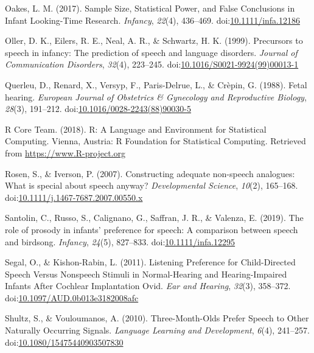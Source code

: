 \documentclass[man]{apa6}
\begin{document}
\hypertarget{ref-oakes_sample_2017}{}
Oakes, L. M. (2017). Sample Size, Statistical Power, and False
Conclusions in Infant Looking-Time Research. \emph{Infancy},
\emph{22}(4), 436--469.
doi:\href{https://doi.org/10.1111/infa.12186}{10.1111/infa.12186}

\hypertarget{ref-oller_precursors_1999}{}
Oller, D. K., Eilers, R. E., Neal, A. R., \& Schwartz, H. K. (1999).
Precursors to speech in infancy: The prediction of speech and language
disorders. \emph{Journal of Communication Disorders}, \emph{32}(4),
223--245.
doi:\href{https://doi.org/10.1016/S0021-9924(99)00013-1}{10.1016/S0021-9924(99)00013-1}

\hypertarget{ref-querleu_fetal_1988}{}
Querleu, D., Renard, X., Versyp, F., Paris-Delrue, L., \& Crèpin, G.
(1988). Fetal hearing. \emph{European Journal of Obstetrics \&
Gynecology and Reproductive Biology}, \emph{28}(3), 191--212.
doi:\href{https://doi.org/10.1016/0028-2243(88)90030-5}{10.1016/0028-2243(88)90030-5}

\hypertarget{ref-r_core_team_r:_2018}{}
R Core Team. (2018). R: A Language and Environment for Statistical
Computing. Vienna, Austria: R Foundation for Statistical Computing.
Retrieved from \url{https://www.R-project.org}

\hypertarget{ref-rosen_constructing_2007}{}
Rosen, S., \& Iverson, P. (2007). Constructing adequate non-speech
analogues: What is special about speech anyway? \emph{Developmental
Science}, \emph{10}(2), 165--168.
doi:\href{https://doi.org/10.1111/j.1467-7687.2007.00550.x}{10.1111/j.1467-7687.2007.00550.x}

\hypertarget{ref-santolin_role_2019}{}
Santolin, C., Russo, S., Calignano, G., Saffran, J. R., \& Valenza, E.
(2019). The role of prosody in infants' preference for speech: A
comparison between speech and birdsong. \emph{Infancy}, \emph{24}(5),
827--833.
doi:\href{https://doi.org/10.1111/infa.12295}{10.1111/infa.12295}

\hypertarget{ref-segal_listening_2011}{}
Segal, O., \& Kishon-Rabin, L. (2011). Listening Preference for
Child-Directed Speech Versus Nonspeech Stimuli in Normal-Hearing and
Hearing-Impaired Infants After Cochlear Implantation Ovid. \emph{Ear and
Hearing}, \emph{32}(3), 358--372.
doi:\href{https://doi.org/10.1097/AUD.0b013e3182008afc}{10.1097/AUD.0b013e3182008afc}

\hypertarget{ref-shultz_three-month-olds_2010}{}
Shultz, S., \& Vouloumanos, A. (2010). Three-Month-Olds Prefer Speech to
Other Naturally Occurring Signals. \emph{Language Learning and
Development}, \emph{6}(4), 241--257.
doi:\href{https://doi.org/10.1080/15475440903507830}{10.1080/15475440903507830}
\end{document}
